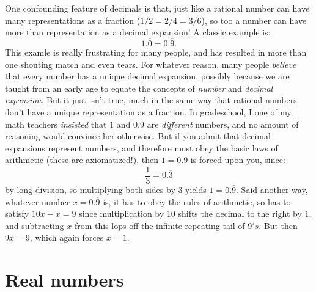 \documentclass[11pt]{amsart}
\theoremstyle{plain}
\theoremstyle{definition}
\theoremstyle{remark}
\numberwithin{theorem}{section}
\numberwithin{equation}{section}
\begin{document}
One confounding feature of decimals is that, just like a rational number can have many representations as a fraction ($1/2 = 2/4 = 3/6$),
so too a number can have more than representation as a decimal expansion!  A classic example is:
$$
  1.\overline{0} = 0.\overline{9}.
$$ 
This examle is really frustrating for many people, and has resulted in more than one shouting match and even tears. 
For whatever reason, many people {\em believe} that every number has a unique decimal expansion, possibly because
we are taught from an early age to equate the concepts of {\em number} and {\em decimal expansion}.  But it just isn't true,
much in the same way that rational numbers don't have a unique representation as a fraction.  In gradeschool, I one of my math teachers
{\em insisted} that $1$ and $0.\overline{9}$ are {\em different} numbers, and no amount of reasoning would convince her otherwise.  But if you
admit that decimal expansions represent numbers, and therefore must obey the basic laws of arithmetic (these are axiomatized!), then
$1=0.\overline{9}$ is forced upon you, since:
$$
\frac{1}{3} = 0.\overline{3}
$$
by long division, so multiplying both sides by 3 yields $1=0.\overline{9}$.  Said another way, whatever number $x=0.\overline{9}$
is, it has to obey the rules of arithmetic, so has to satisfy $10x - x = 9$ since multiplication by 10 shifts the decimal to the right by 1, 
and subtracting $x$ from this lops off the infinite repeating tail of $9's$.  But then $9x=9$, which again forces $x=1$.

\section{Real numbers}
\end{document}
